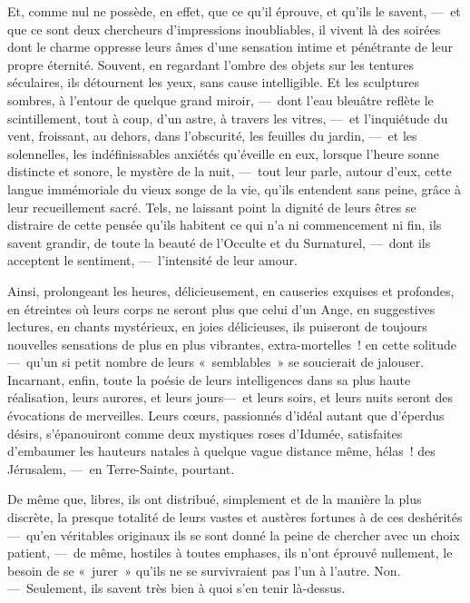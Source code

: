 \documentclass[french,twoside]{book} %
\begin{document}
Et, comme nul ne possède, en effet, que ce qu’il éprouve, et qu’ils le savent, — et que ce sont deux chercheurs d’impressions inoubliables, il vivent là des soirées dont le charme oppresse leurs âmes d’une sensation intime et pénétrante de leur propre éternité. Souvent, en regardant l’ombre des objets sur les tentures séculaires, ils détournent les yeux, sans cause intelligible. Et les sculptures sombres, à l’entour de quelque grand miroir, — dont l’eau bleuâtre reflète le scintillement, tout à coup, d’un astre, à travers les vitres, — et l’inquiétude du vent, froissant, au dehors, dans l’obscurité, les feuilles du jardin, — et les solennelles, les indéfinissables anxiétés qu’éveille en eux, lorsque l’heure sonne distincte et sonore, le mystère de la nuit, — tout leur parle, autour d’eux, cette langue immémoriale du vieux songe de la vie, qu’ils entendent sans peine, grâce à leur recueillement sacré. Tels, ne laissant point la dignité de leurs êtres   se distraire de cette pensée qu’ils habitent ce qui n’a ni commencement ni fin, ils savent grandir, de toute la beauté de l’Occulte et du Surnaturel, — dont ils acceptent le sentiment, — l’intensité de leur amour.\par
Ainsi, prolongeant les heures, délicieusement, en causeries exquises et profondes, en étreintes où leurs corps ne seront plus que celui d’un Ange, en suggestives lectures, en chants mystérieux, en joies délicieuses, ils puiseront de toujours nouvelles sensations de plus en plus vibrantes, extra-mortelles ! en cette solitude— qu’un si petit nombre de leurs « semblables » se soucierait de jalouser. Incarnant, enfin, toute la poésie de leurs intelligences dans sa plus haute réalisation, leurs aurores, et leurs jours— et leurs soirs, et leurs nuits seront des évocations de merveilles. Leurs cœurs, passionnés d’idéal autant que d’éperdus désirs, s’épanouiront comme deux mystiques roses d’Idumée, satisfaites d’embaumer les hauteurs natales à quelque vague distance même, hélas ! des Jérusalem, — en Terre-Sainte, pourtant.\par
   De même que, libres, ils ont distribué, simplement et de la manière la plus discrète, la presque totalité de leurs vastes et austères fortunes à de ces deshérités— qu’en véritables originaux ils se sont donné la peine de chercher avec un choix patient, — de même, hostiles à toutes emphases, ils n’ont éprouvé nullement, le besoin de se « jurer » qu’ils ne se survivraient pas l’un à l’autre. Non. — Seulement, ils savent très bien à quoi s’en tenir là-dessus.\par
\end{document}
